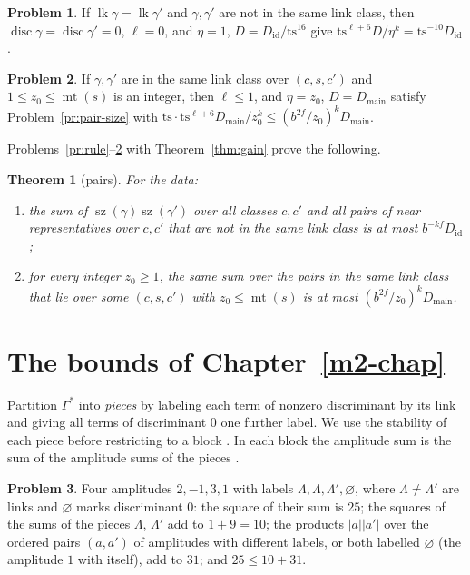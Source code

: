 \documentclass[reqno]{amsart}
\newcounter{chap}
\theoremstyle{definition}
\newtheorem{problem}{Problem}[section]
\theoremstyle{plain}
\newtheorem{theorem}{Theorem}[section]
\theoremstyle{remark}
\newcommand{\Did}{D_{\mathrm{id}}}
\newcommand{\Dmain}{D_{\mathrm{main}}}
\newcommand{\disc}{\operatorname{disc}}
\newcommand{\lk}{\operatorname{lk}}
\newcommand{\mt}{\operatorname{mt}}
\newcommand{\ts}{\mathrm{ts}}
\newcommand{\sz}{\operatorname{sz}}
\begin{document}
\begin{problem}\label{pr:zero-disc}
If \(\lk\gamma=\lk\gamma'\) and \(\gamma,\gamma'\) are not in the same link class, then \(\disc\gamma=\disc\gamma'=0\), \(\ell=0\), and \(\eta=1\), \(D=\Did/\ts^{16}\) give \(\ts^{\ell+6}D/\eta^k=\ts^{-10}\Did\).
\end{problem}

\begin{problem}\label{pr:same-class}
If \(\gamma,\gamma'\) are in the same link class over \((c,s,c')\) and \(1\le z_0\le\mt(s)\) is an integer, then \(\ell\le1\), and \(\eta=z_0\), \(D=\Dmain\) satisfy Problem~\ref{pr:pair-size} with \(\ts\cdot\ts^{\ell+6}\Dmain/z_0^k\le(b^{2f}/z_0)^k\Dmain\).
\end{problem}

Problems~\ref{pr:rule}--\ref{pr:same-class} with Theorem~\ref{thm:gain} prove the following.

\begin{theorem}[pairs]\label{thm:pairs}
For the data:
\begin{enumerate}
\item[(a)] the sum of \(\sz(\gamma)\sz(\gamma')\) over all classes \(c,c'\) and all pairs of near representatives over \(c,c'\) that are not in the same link class is at most \(b^{-kf}\Did\);
\item[(b)] for every integer \(z_0\ge1\), the same sum over the pairs in the same link class that lie over some \((c,s,c')\) with \(z_0\le\mt(s)\) is at most \((b^{2f}/z_0)^k\Dmain\).
\end{enumerate}
\end{theorem}

\section{The bounds of Chapter~\texorpdfstring{\ref{m2-chap}}{M2}}\label{sec:back}

Partition \(\Gamma^*\) into \emph{pieces} by labeling each term of nonzero discriminant by its link and giving all terms of discriminant \(0\) one further label.  We use the stability of each piece before restricting to a block \cite[\texttt{TermStructure.lean}, l.~843 and \texttt{Sum.lean}, l.~512]{GL}.  In each block the amplitude sum is the sum of the amplitude sums of the pieces \cite[\texttt{Sum.lean}, l.~498 and \texttt{Size.lean}, l.~709]{GL}.

\begin{problem}\label{pr:toy-pieces}
Four amplitudes \(2,-1,3,1\) with labels \(\Lambda,\Lambda,\Lambda',\varnothing\), where \(\Lambda\ne\Lambda'\) are links and \(\varnothing\) marks discriminant \(0\): the square of their sum is \(25\); the squares of the sums of the pieces \(\Lambda\), \(\Lambda'\) add to \(1+9=10\); the products \(\lvert a\rvert\lvert a'\rvert\) over the ordered pairs \((a,a')\) of amplitudes with different labels, or both labelled \(\varnothing\) (the amplitude \(1\) with itself), add to \(31\); and \(25\le10+31\).
\end{problem}
\end{document}
